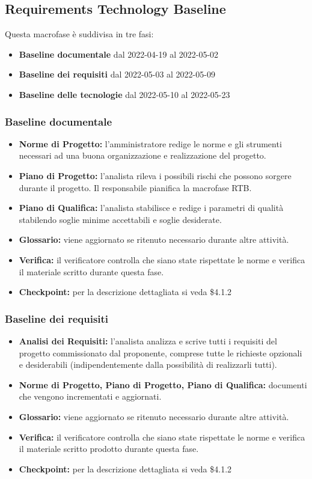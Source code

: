 \subsection{Requirements Technology Baseline}
Questa macrofase è suddivisa in tre fasi:
\begin{itemize}
    \item \textbf{Baseline documentale} dal 2022-04-19 al 2022-05-02
    \item \textbf{Baseline dei requisiti} dal 2022-05-03 al 2022-05-09
    \item \textbf{Baseline delle tecnologie} dal 2022-05-10 al 2022-05-23
\end{itemize}

\subsubsection{Baseline documentale}
\begin{itemize}
    \item \textbf{Norme di Progetto:} l'amministratore redige le norme e gli strumenti necessari ad una buona organizzazione e realizzazione del progetto.
    \item \textbf{Piano di Progetto:} l'analista rileva i possibili rischi che possono sorgere durante il progetto. Il responsabile pianifica la macrofase RTB.
    \item \textbf{Piano di Qualifica:} l'analista stabilisce e redige i parametri di qualità stabilendo soglie minime accettabili e soglie desiderate. 
    \item \textbf{Glossario:} viene aggiornato se ritenuto necessario durante altre attività.
    \item \textbf{Verifica:} il verificatore controlla che siano state rispettate le norme e verifica il materiale scritto durante questa fase.
    \item \textbf{Checkpoint:} per la descrizione dettagliata si veda \$4.1.2 
\end{itemize}

\subsubsection{Baseline dei requisiti}
\begin{itemize}
    \item \textbf{Analisi dei Requisiti:} l'analista analizza e scrive tutti i requisiti del progetto commissionato dal proponente, 
                comprese tutte le richieste opzionali e desiderabili (indipendentemente dalla possibilità di realizzarli tutti).
    \item \textbf{Norme di Progetto, Piano di Progetto, Piano di Qualifica:} documenti che vengono incrementati e aggiornati.
    \item \textbf{Glossario:} viene aggiornato se ritenuto necessario durante altre attività.
    \item \textbf{Verifica:} il verificatore controlla che siano state rispettate le norme e verifica il materiale scritto prodotto durante questa fase.
    \item \textbf{Checkpoint:} per la descrizione dettagliata si veda \$4.1.2
\end{itemize}

